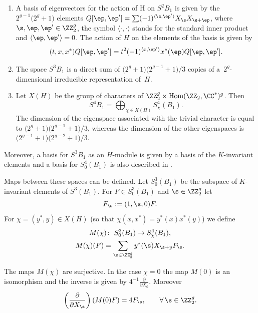 \begin{Proposition}\label{pr.vG1}\quad
\begin{enumerate}\itemsep=0pt
\item[$(i)$] A basis of eigenvectors for the action of H on $S^2B_1$ is given by the $2^{g-1}\big( 2^{g}+1\big)$ elements $Q[\ep, \ep']=\sum(-1)^{\langle \s,\ep'\rangle}X_{\s}X_{\s+\ep}$, where $\s, \ep, \ep'\in\ZZ_2^g$, the symbol $\langle \cdot,\cdot\rangle$ stands for the standard inner product and $\langle \ep,\ep'\rangle=0$. The action of $H$ on the elements of the basis is given by
\[
(t, x, x^*)Q[\ep, \ep']=t^2(-1)^{\langle x,\ep'\rangle}x^*(\ep)Q[\ep, \ep'].
\]
\item[$(ii)$] The space $S^3B_1$ is a direct sum of $\big(2^g+1\big)\big(2^{g-1}+1\big)/3$ copies of a~$2^g$-dimensional irreducible representation of~$H$.
\item[$(iii)$]Let $X(H)$ be the group of characters of $\ZZ_{2}^g\times {\rm Hom}(\ZZ_{2}, \CC^{*})^g$. Then
\[
S^4B_1= \bigoplus_{\chi\in X(H)} S^4_{\chi}(B_1).
\]
The dimension of the eigenspace associated with the trivial character is equal to $\big(2^g+1\big)\big(2^{g-1}+1\big)/3$, whereas the dimension of the other eigenspaces is $\big(2^{g-1}+1\big)\big(2^{g-2}+1\big)/3$.
\end{enumerate}
\end{Proposition}

Moreover, a basis for $S^3B_1$ as an $H$-module is given by a basis of the $K$-invariant elements and a basis for $S^4_{0}(B_1)$ is also described in \cite{vG}.

Maps between these spaces can be defined. Let $S^3_{0}(B_1)$ be the subspace of $K$-invariant elements of $S^3(B_1)$.
 For $F\in S^3_{0}(B_1)$ and $ \s\in \ZZ_{2}^g$ let
\[
F_{\s}:=( 1, \s, 0)F.
\]
For $\chi=(y^*, y)\in X(H)$ (so that $\chi(x, x^*)=y^*(x)x^*(y)$) we define
\begin{gather*}
M(\chi)\colon \ S^3_{0}(B_1)\to S^4_{\chi}(B_1),\\
M(\chi)(F)= \sum_{\s\in \ZZ_{2}^g} y^*(\s)X_{\s+y}F_{\s}.
\end{gather*}

 \begin{Proposition} \label{pr.vG2}The maps $M(\chi)$ are surjective. In the case $\chi=0$ the map $M(0)$ is an isomorphism and the inverse is given by $ 4^{-1}\frac{\partial}{\partial X_0}$. Moreover
\[
\left(\frac{\partial}{\partial X_{\s}}\right)(M(0)F)=4F_{\s},\qquad \forall\, \s\in \ZZ_{2}^g.
\]
\end{Proposition}

